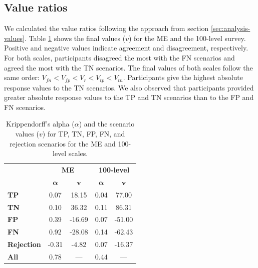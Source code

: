 \subsection{Value ratios}
\label{sec:results-value-ratios}
We calculated the value ratios following the approach from section \ref{sec:analysis-values}.
%
Table \ref{tab:values-reliability} shows the final values ($v$) for the ME and the 100-level survey.
%
Positive and negative values indicate agreement and disagreement, respectively.
%
For both scales, participants disagreed the most with the FN scenarios and agreed the most with the TN scenarios.
%
The final values of both scales follow the same order: $V_{fn} < V_{fp} < V_{r} < V_{tp} < V_{tn}$.
%
Participants give the highest absolute response values to the TN scenarios.
%
We also observed that participants provided greater absolute response values to the TP and TN scenarios than to the FP and FN scenarios.
%
\begin{table}[t]
    \small
    \centering
    \begin{tabular}{lcccc}
        \toprule
                           & \multicolumn{2}{c}{\textbf{ME}} & \multicolumn{2}{c}{\textbf{100-level}}                                        \\
        \cmidrule(l){2-3} \cmidrule(l){4-5}
                           & $\boldsymbol{\alpha}$           & $\textbf{v}$                           & $\boldsymbol{\alpha}$ & $\textbf{v}$ \\
        \midrule
        \textbf{TP}        & 0.07                            & 18.15                                  & 0.04                  & 77.00        \\
        \textbf{TN}        & 0.10                            & 36.32                                  & 0.11                  & 86.31        \\
        \textbf{FP}        & 0.39                            & -16.69                                 & 0.07                  & -51.00       \\
        \textbf{FN}        & 0.92                            & -28.08                                 & 0.14                  & -62.43       \\
        \textbf{Rejection} & -0.31                           & -4.82                                  & 0.07                  & -16.37       \\
        \midrule
        \textbf{All}       & 0.78                            & ---                                    & 0.44                  & ---          \\
        \bottomrule
    \end{tabular}
    \caption{Krippendorff's alpha ($\alpha$) and the scenario values ($v$) for TP, TN, FP, FN, and rejection scenarios for the ME and 100-level scales.}
    \label{tab:values-reliability}
\end{table}

